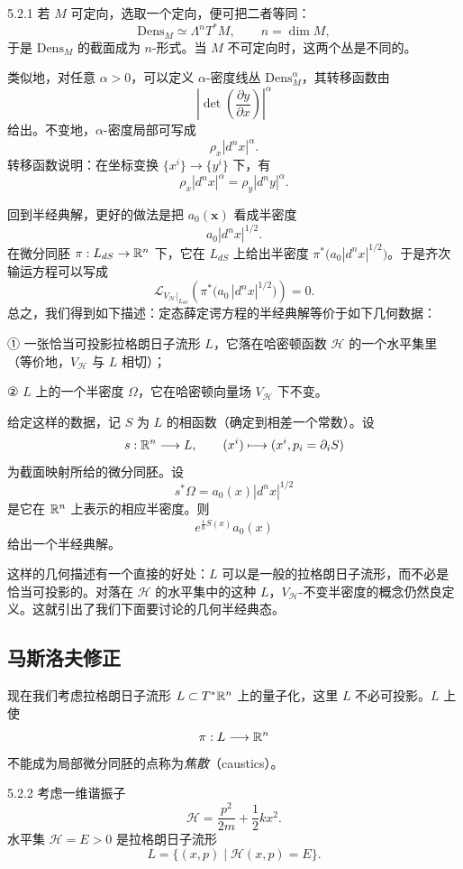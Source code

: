 
\begin{remark}{5.2.1}
若 $M$ 可定向，选取一个定向，便可把二者等同：
\[
\mathrm{Dens}_M\simeq\Lambda^nT^*M,\qquad n=\dim M,
\]
于是 $\mathrm{Dens}_M$ 的截面成为 $n$-形式。当 $M$ 不可定向时，这两个丛是不同的。
\end{remark}

类似地，对任意 $\alpha>0$，可以定义 $\alpha$-密度线丛 $\mathrm{Dens}_M^\alpha$，其转移函数由
\[
\left|\det\left(\frac{\partial y}{\partial x}\right)\right|^\alpha
\]
给出。不变地，$\alpha$-密度局部可写成
\[
\rho_x|d^nx|^\alpha.
\]
转移函数说明：在坐标变换 $\{x^i\}\to\{y^i\}$ 下，有
\[
\rho_x|d^nx|^\alpha=\rho_y|d^ny|^\alpha.
\]

回到半经典解，更好的做法是把 $a_0(\mathbf{x})$ 看成半密度
\[
a_0|d^nx|^{1/2}.
\]
在微分同胚 $\pi:L_{dS}\to\mathbb{R}^n$ 下，它在 $L_{dS}$ 上给出半密度 $\pi^*\big(a_0|d^nx|^{1/2}\big)$。于是齐次输运方程可以写成
\[
\mathcal{L}_{V_{\mathcal{H}}|_{L_{dS}}}\left(\pi^*\Big(a_0\,|d^nx|^{1/2}\Big)\right)=0.
\]
总之，我们得到如下描述：定态薛定谔方程的半经典解等价于如下几何数据：

① 一张恰当可投影拉格朗日子流形 $L$，它落在哈密顿函数 $\mathcal{H}$ 的一个水平集里（等价地，$V_{\mathcal{H}}$ 与 $L$ 相切）；

② $L$ 上的一个半密度 $\Omega$，它在哈密顿向量场 $V_{\mathcal{H}}$ 下不变。

给定这样的数据，记 $S$ 为 $L$ 的相函数（确定到相差一个常数）。设
\[
s:\mathbb{R}^n\longrightarrow L,\qquad (x^i)\longmapsto(x^i,p_i=\partial_iS)
\]
为截面映射所给的微分同胚。设
\[
s^*\Omega=a_0(x)|d^nx|^{1/2}
\]
是它在 $\mathbb{R}^n$ 上表示的相应半密度。则
\[
e^{\frac{i}{\hbar}S(x)}a_0(x)
\]
给出一个半经典解。

这样的几何描述有一个直接的好处：$L$ 可以是一般的拉格朗日子流形，而不必是恰当可投影的。对落在 $\mathcal{H}$ 的水平集中的这种 $L$，$V_{\mathcal{H}}$-不变半密度的概念仍然良定义。这就引出了我们下面要讨论的几何半经典态。


\subsection{马斯洛夫修正}

现在我们考虑拉格朗日子流形 $L\subset T^*\mathbb{R}^n$ 上的量子化，这里 $L$ 不必可投影。$L$ 上使
\[
\pi:L\longrightarrow\mathbb{R}^n
\]
不能成为局部微分同胚的点称为\emph{焦散}（caustics）。

\begin{example}{5.2.2}
考虑一维谐振子
\[
\mathcal{H}=\frac{p^2}{2m}+\frac12kx^2.
\]
水平集 $\mathcal{H}=E>0$ 是拉格朗日子流形
\[
L=\{(x,p)\mid \mathcal{H}(x,p)=E\}.
\]
\end{example}

